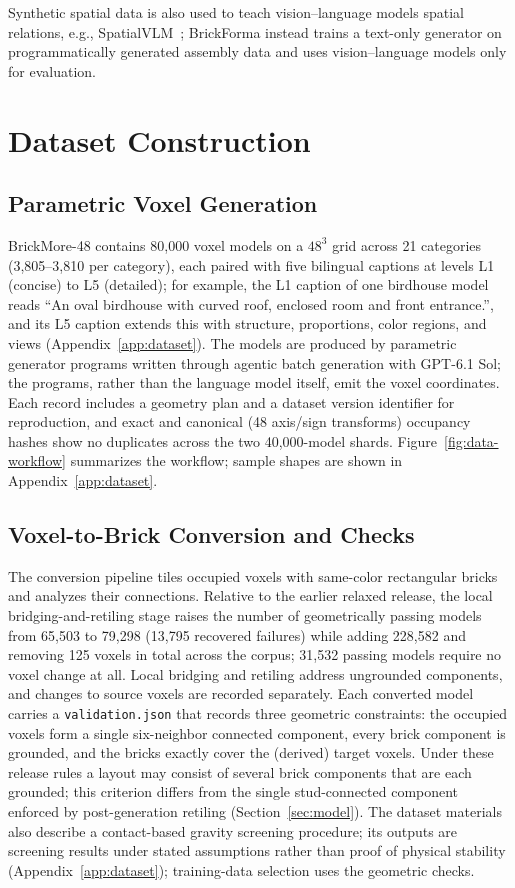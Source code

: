 \documentclass[letterpaper]{article} %
\begin{document}
Synthetic spatial data is also used to teach vision--language models spatial relations, e.g., SpatialVLM~\cite{spatialvlm}; BrickForma instead trains a text-only generator on programmatically generated assembly data and uses vision--language models only for evaluation.

\section{Dataset Construction}
\label{sec:dataset}
\subsection{Parametric Voxel Generation}
BrickMore-48 contains 80,000 voxel models on a $48^3$ grid across 21 categories (3,805--3,810 per category), each paired with five bilingual captions at levels L1 (concise) to L5 (detailed); for example, the L1 caption of one birdhouse model reads ``An oval birdhouse with curved roof, enclosed room and front entrance.'', and its L5 caption extends this with structure, proportions, color regions, and views (Appendix~\ref{app:dataset}). The models are produced by parametric generator programs written through agentic batch generation with GPT-6.1 Sol; the programs, rather than the language model itself, emit the voxel coordinates. Each record includes a geometry plan and a dataset version identifier for reproduction, and exact and canonical (48 axis/sign transforms) occupancy hashes show no duplicates across the two 40,000-model shards. Figure~\ref{fig:data-workflow} summarizes the workflow; sample shapes are shown in Appendix~\ref{app:dataset}.


\subsection{Voxel-to-Brick Conversion and Checks}
The conversion pipeline tiles occupied voxels with same-color rectangular bricks and analyzes their connections. Relative to the earlier relaxed release, the local bridging-and-retiling stage raises the number of geometrically passing models from 65,503 to 79,298 (13,795 recovered failures) while adding 228,582 and removing 125 voxels in total across the corpus; 31,532 passing models require no voxel change at all. Local bridging and retiling address ungrounded components, and changes to source voxels are recorded separately. Each converted model carries a \texttt{validation.json} that records three geometric constraints: the occupied voxels form a single six-neighbor connected component, every brick component is grounded, and the bricks exactly cover the (derived) target voxels. Under these release rules a layout may consist of several brick components that are each grounded; this criterion differs from the single stud-connected component enforced by post-generation retiling (Section~\ref{sec:model}). The dataset materials also describe a contact-based gravity screening procedure; its outputs are screening results under stated assumptions rather than proof of physical stability (Appendix~\ref{app:dataset}); training-data selection uses the geometric checks.
\end{document}
